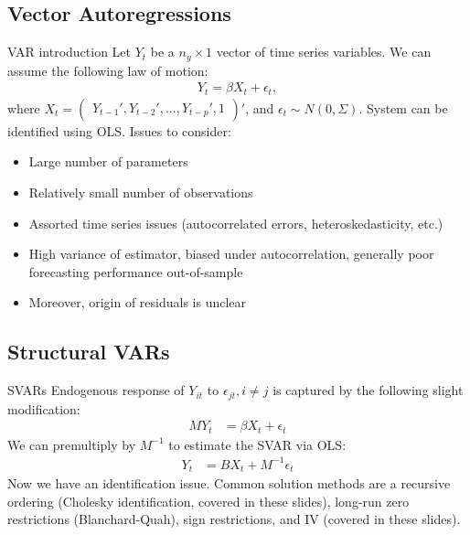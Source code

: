 \documentclass{beamer}
\begin{document}
\subsection{Vector Autoregressions}
\begin{frame}{VAR introduction}
Let $Y_t$ be a $n_y \times 1$ vector of time series variables. We can assume the following law of motion:
\begin{align*}
Y_t =   \beta X_t + \epsilon_t,
\end{align*}
where $X_t = \begin{pmatrix}Y_{t-1}', Y_{t-2}', \dots, Y_{t-p}', 1 \end{pmatrix}'$, and $\epsilon_t \sim N(0,\Sigma)$. System can be identified using OLS. Issues to consider:
\begin{itemize}
\item Large number of parameters
\item Relatively small number of observations
\item Assorted time series issues (autocorrelated errors, heteroskedasticity, etc.)
\item High variance of estimator, biased under autocorrelation, generally poor forecasting performance out-of-sample
\item Moreover, origin of residuals is unclear
\end{itemize}
\end{frame}
\subsection{Structural VARs}
\begin{frame}{SVARs}
Endogenous response of $Y_{it}$ to $\epsilon_{jt}, i\neq j$  is captured by the following slight modification:
\begin{align*}
M Y_t &= \beta X_t + \epsilon_t
\end{align*}
We can premultiply by $M^{-1}$ to estimate the SVAR via OLS: 
\begin{align*}
 Y_t &= B X_t + M^{-1}\epsilon_t
\end{align*}
Now we have an identification issue. Common solution methods are a recursive ordering (Cholesky identification, covered in these slides), long-run zero restrictions (Blanchard-Quah),  sign restrictions, and IV (covered in these slides).
\end{frame}
\end{document}
